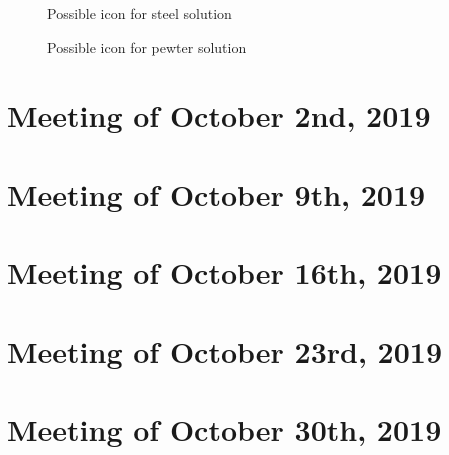 \documentclass{article}
\begin{document}
  \begin{figure}[!htb]
  \caption {Possible icon for steel solution}
  \end{figure}

  \begin{figure}[!htb]
  \caption {Possible icon for pewter solution}
  \end{figure}


\section{Meeting of October 2nd, 2019}

\section{Meeting of October 9th, 2019}

\section{Meeting of October 16th, 2019}

\section{Meeting of October 23rd, 2019}

\section{Meeting of October 30th, 2019}
\end{document}
